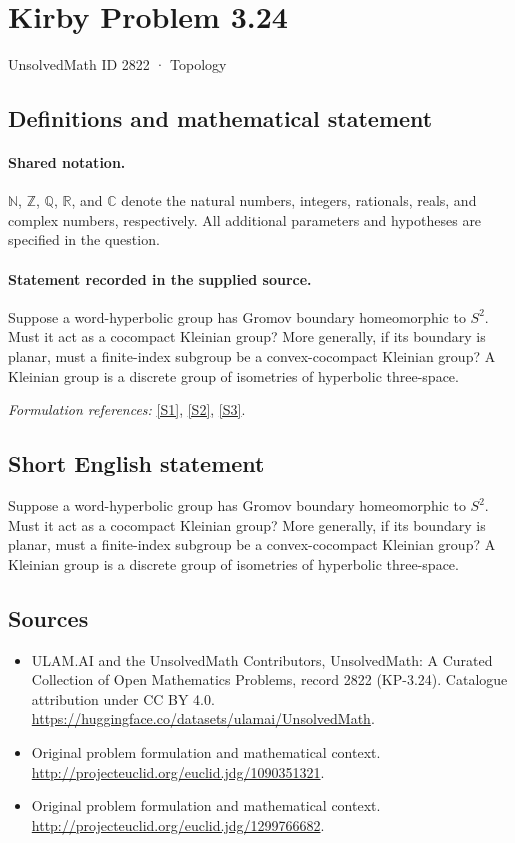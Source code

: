 \documentclass[11pt]{article}
\newcommand{\sref}[2]{\hyperlink{source:#1:#2}{[S#2]}}
\begin{document}
\setcounter{section}{2821}
\section{Kirby Problem 3.24}\label{2822}
{\small UnsolvedMath ID 2822 · Topology}
\subsection{Definitions and mathematical statement}

\paragraph{Shared notation.}$\mathbb N$, $\mathbb Z$, $\mathbb Q$, $\mathbb R$, and $\mathbb C$ denote the natural numbers, integers, rationals, reals, and complex numbers, respectively. All additional parameters and hypotheses are specified in the question.


\paragraph{Statement recorded in the supplied source.}
Suppose a word-hyperbolic group has Gromov boundary homeomorphic to $S^2$. Must it act as a cocompact Kleinian group? More generally, if its boundary is planar, must a finite-index subgroup be a convex-cocompact Kleinian group? A Kleinian group is a discrete group of isometries of hyperbolic three-space.
\par\smallskip\textit{Formulation references:} \sref{2822}{1}, \sref{2822}{2}, \sref{2822}{3}.
\subsection{Short English statement}
Suppose a word-hyperbolic group has Gromov boundary homeomorphic to $S^2$. Must it act as a cocompact Kleinian group? More generally, if its boundary is planar, must a finite-index subgroup be a convex-cocompact Kleinian group? A Kleinian group is a discrete group of isometries of hyperbolic three-space.
\subsection{Sources}
\begin{itemize}
\item[\hypertarget{source:2822:1}{S1}] ULAM.AI and the UnsolvedMath Contributors, UnsolvedMath: A Curated Collection of Open Mathematics Problems, record 2822 (KP-3.24). Catalogue attribution under CC BY 4.0.
\url{https://huggingface.co/datasets/ulamai/UnsolvedMath}.
\item[\hypertarget{source:2822:2}{S2}] Original problem formulation and mathematical context.
\url{http://projecteuclid.org/euclid.jdg/1090351321}.
\item[\hypertarget{source:2822:3}{S3}] Original problem formulation and mathematical context.
\url{http://projecteuclid.org/euclid.jdg/1299766682}.
\end{itemize}
\label{end:2822}
\end{document}
